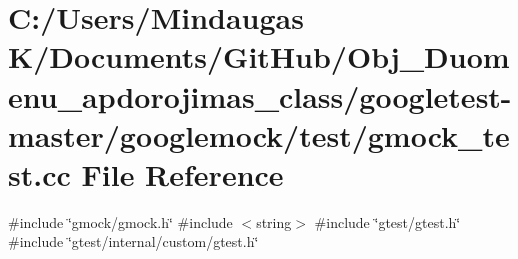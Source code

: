 \hypertarget{googletest-master_2googlemock_2test_2gmock__test_8cc}{}\section{C\+:/\+Users/\+Mindaugas K/\+Documents/\+Git\+Hub/\+Obj\+\_\+\+Duomenu\+\_\+apdorojimas\+\_\+class/googletest-\/master/googlemock/test/gmock\+\_\+test.cc File Reference}
\label{googletest-master_2googlemock_2test_2gmock__test_8cc}
{\ttfamily \#include \char`\"{}gmock/gmock.\+h\char`\"{}}\newline
{\ttfamily \#include $<$string$>$}\newline
{\ttfamily \#include \char`\"{}gtest/gtest.\+h\char`\"{}}\newline
{\ttfamily \#include \char`\"{}gtest/internal/custom/gtest.\+h\char`\"{}}\newline
